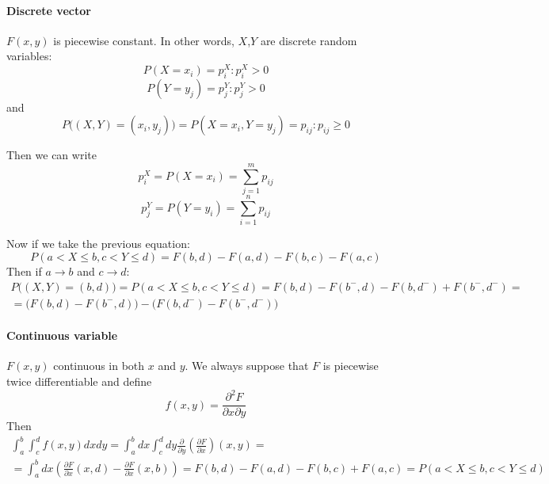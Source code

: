 \paragraph{Discrete vector}
$F(x,y)$ is piecewise constant. In other words, $X$,$Y$ are discrete random variables:
$$P(X=x_i) = p_i^X : p_i^X > 0$$
$$P(Y=y_j) = p_j^Y : p_j^Y > 0$$
and
$$P\Big((X,Y) = (x_i, y_j)\Big)  = P(X=x_i, Y=y_j) = p_{ij}: p_{ij} \geq 0$$

Then we can write
$$p_i^X = P(X=x_i) = \sum_{j=1}^m p_{ij}$$
$$p_j^Y = P(Y=y_i) = \sum_{i=1}^n p_{ij}$$

Now if we take the previous equation:
$$P(a<X \leq b , c < Y \leq d) = F(b,d)-F(a,d) -F(b,c)-F(a,c)$$
Then if $a \to b$ and $c \to d$:
\begin{align*}
P\Big((X,Y) = (b,d)\Big) = P(a<X \leq b , c < Y \leq d) = F(b,d)-F(b^-,d) -F(b,d^-)+F(b^-, d^-) =\\= \big( F(b,d)-F(b^-,d) \big) - \big( F(b,d^-)-F(b^-, d^-)  \big)
\end{align*}

\paragraph{Continuous variable}
$F(x,y)$ continuous in both $x$ and $y$. We always suppose that $F$ is piecewise twice differentiable and define
$$f(x,y) = \frac{\partial^2 F}{\partial x \partial y}$$
Then
\begin{align*}
\int_a^b \int_c^d f(x,y) dxdy = \int_a^b dx \int_c^d dy \frac{\partial}{\partial y} \left( \frac{\partial F}{\partial x} \right) (x,y)  =\\= \int_a^b dx \left(\frac{\partial F}{\partial x}(x,d) - \frac{\partial F}{\partial x}(x,b)\right) = F(b,d) -F(a,d) - F(b,c) + F(a,c) = P(a<X \leq b , c < Y \leq d)
\end{align*}